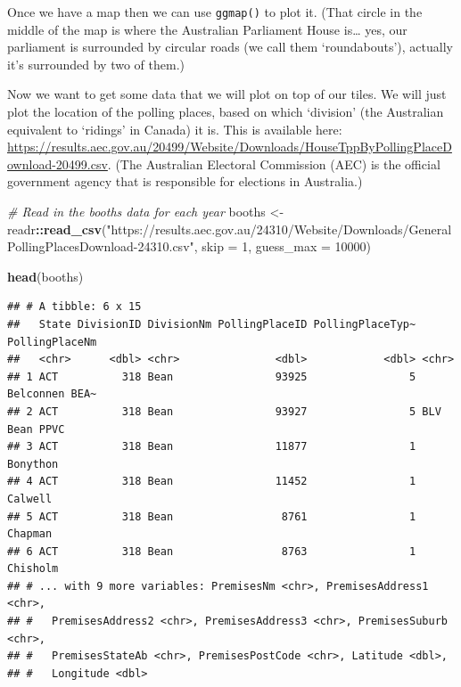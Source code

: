 \documentclass[
]{book}
\newenvironment{Shaded}{\begin{snugshade}}{\end{snugshade}}
\newcommand{\CommentTok}[1]{\textcolor[rgb]{0.56,0.35,0.01}{\textit{#1}}}
\newcommand{\DataTypeTok}[1]{\textcolor[rgb]{0.13,0.29,0.53}{#1}}
\newcommand{\DecValTok}[1]{\textcolor[rgb]{0.00,0.00,0.81}{#1}}
\newcommand{\KeywordTok}[1]{\textcolor[rgb]{0.13,0.29,0.53}{\textbf{#1}}}
\newcommand{\NormalTok}[1]{#1}
\newcommand{\OperatorTok}[1]{\textcolor[rgb]{0.81,0.36,0.00}{\textbf{#1}}}
\newcommand{\StringTok}[1]{\textcolor[rgb]{0.31,0.60,0.02}{#1}}
\begin{document}
Once we have a map then we can use \texttt{ggmap()} to plot it. (That circle in the middle of the map is where the Australian Parliament House is\ldots{} yes, our parliament is surrounded by circular roads (we call them `roundabouts'), actually it's surrounded by two of them.)

Now we want to get some data that we will plot on top of our tiles. We will just plot the location of the polling places, based on which `division' (the Australian equivalent to `ridings' in Canada) it is. This is available here: \url{https://results.aec.gov.au/20499/Website/Downloads/HouseTppByPollingPlaceDownload-20499.csv}. (The Australian Electoral Commission (AEC) is the official government agency that is responsible for elections in Australia.)

\begin{Shaded}
\begin{Highlighting}[]
\CommentTok{# Read in the booths data for each year}
\NormalTok{booths <-}\StringTok{ }\NormalTok{readr}\OperatorTok{::}\KeywordTok{read_csv}\NormalTok{(}\StringTok{"https://results.aec.gov.au/24310/Website/Downloads/GeneralPollingPlacesDownload-24310.csv"}\NormalTok{, }
                          \DataTypeTok{skip =} \DecValTok{1}\NormalTok{, }
                          \DataTypeTok{guess_max =} \DecValTok{10000}\NormalTok{)}

\KeywordTok{head}\NormalTok{(booths)}
\end{Highlighting}
\end{Shaded}

\begin{verbatim}
## # A tibble: 6 x 15
##   State DivisionID DivisionNm PollingPlaceID PollingPlaceTyp~ PollingPlaceNm
##   <chr>      <dbl> <chr>               <dbl>            <dbl> <chr>         
## 1 ACT          318 Bean                93925                5 Belconnen BEA~
## 2 ACT          318 Bean                93927                5 BLV Bean PPVC 
## 3 ACT          318 Bean                11877                1 Bonython      
## 4 ACT          318 Bean                11452                1 Calwell       
## 5 ACT          318 Bean                 8761                1 Chapman       
## 6 ACT          318 Bean                 8763                1 Chisholm      
## # ... with 9 more variables: PremisesNm <chr>, PremisesAddress1 <chr>,
## #   PremisesAddress2 <chr>, PremisesAddress3 <chr>, PremisesSuburb <chr>,
## #   PremisesStateAb <chr>, PremisesPostCode <chr>, Latitude <dbl>,
## #   Longitude <dbl>
\end{verbatim}
\end{document}
